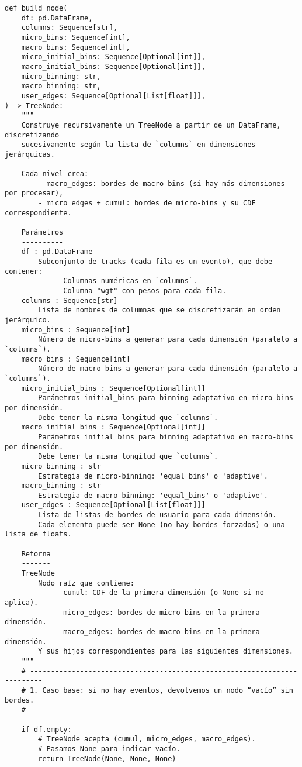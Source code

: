 \begin{verbatim}
def build_node(
    df: pd.DataFrame,
    columns: Sequence[str],
    micro_bins: Sequence[int],
    macro_bins: Sequence[int],
    micro_initial_bins: Sequence[Optional[int]],
    macro_initial_bins: Sequence[Optional[int]],
    micro_binning: str,
    macro_binning: str,
    user_edges: Sequence[Optional[List[float]]],
) -> TreeNode:
    """
    Construye recursivamente un TreeNode a partir de un DataFrame, discretizando
    sucesivamente según la lista de `columns` en dimensiones jerárquicas.

    Cada nivel crea:
        - macro_edges: bordes de macro-bins (si hay más dimensiones por procesar),
        - micro_edges + cumul: bordes de micro-bins y su CDF correspondiente.

    Parámetros
    ----------
    df : pd.DataFrame
        Subconjunto de tracks (cada fila es un evento), que debe contener:
            - Columnas numéricas en `columns`.
            - Columna "wgt" con pesos para cada fila.
    columns : Sequence[str]
        Lista de nombres de columnas que se discretizarán en orden jerárquico.
    micro_bins : Sequence[int]
        Número de micro-bins a generar para cada dimensión (paralelo a `columns`).
    macro_bins : Sequence[int]
        Número de macro-bins a generar para cada dimensión (paralelo a `columns`).
    micro_initial_bins : Sequence[Optional[int]]
        Parámetros initial_bins para binning adaptativo en micro-bins por dimensión.
        Debe tener la misma longitud que `columns`.
    macro_initial_bins : Sequence[Optional[int]]
        Parámetros initial_bins para binning adaptativo en macro-bins por dimensión.
        Debe tener la misma longitud que `columns`.
    micro_binning : str
        Estrategia de micro-binning: 'equal_bins' o 'adaptive'.
    macro_binning : str
        Estrategia de macro-binning: 'equal_bins' o 'adaptive'.
    user_edges : Sequence[Optional[List[float]]]
        Lista de listas de bordes de usuario para cada dimensión.
        Cada elemento puede ser None (no hay bordes forzados) o una lista de floats.

    Retorna
    -------
    TreeNode
        Nodo raíz que contiene:
            - cumul: CDF de la primera dimensión (o None si no aplica).
            - micro_edges: bordes de micro-bins en la primera dimensión.
            - macro_edges: bordes de macro-bins en la primera dimensión.
        Y sus hijos correspondientes para las siguientes dimensiones.
    """
    # -------------------------------------------------------------------------
    # 1. Caso base: si no hay eventos, devolvemos un nodo “vacío” sin bordes.
    # -------------------------------------------------------------------------
    if df.empty:
        # TreeNode acepta (cumul, micro_edges, macro_edges). 
        # Pasamos None para indicar vacío.
        return TreeNode(None, None, None)


\end{verbatim}
